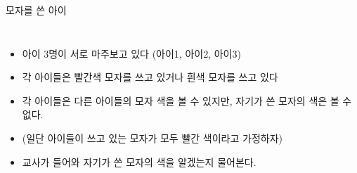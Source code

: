 \documentclass[final]{beamer}
\begin{document}
\begin{frame}[t]{모자를 쓴 아이}
	\begin{columns}
		\begin{itemize}
			\item 아이 3명이 서로 마주보고 있다 (아이1, 아이2, 아이3)
			\item 각 아이들은 빨간색 모자를 쓰고 있거나 흰색 모자를 쓰고 있다
			\item 각 아이들은 다른 아이들의 모자 색을 볼 수 있지만, 자기가 쓴 모자의 색은 볼 수 없다. 
			\item (일단 아이들이 쓰고 있는 모자가 모두 빨간 색이라고 가정하자)
			\item 교사가 들어와 자기가 쓴 모자의 색을 알겠는지 물어본다. 
		\end{itemize}
	\end{columns}
\end{frame}
\end{document}
